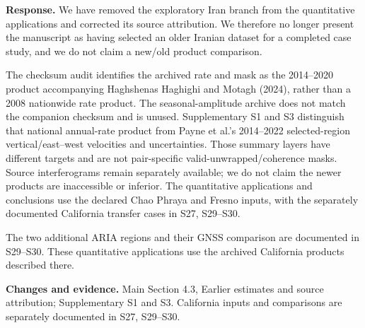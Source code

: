 \documentclass[11pt,a4paper]{article}
\begin{document}
\textbf{Response.} We have removed the exploratory Iran branch from the quantitative applications and corrected its source attribution. We therefore no longer present the manuscript as having selected an older Iranian dataset for a completed case study, and we do not claim a new/old product comparison.

The checksum audit identifies the archived rate and mask as the 2014--2020 product accompanying Haghshenas Haghighi and Motagh (2024), rather than a 2008 nationwide rate product. The seasonal-amplitude archive does not match the companion checksum and is unused. Supplementary S1 and S3 distinguish that national annual-rate product from Payne et al.'s 2014--2022 selected-region vertical/east--west velocities and uncertainties. Those summary layers have different targets and are not pair-specific valid-unwrapped/coherence masks. Source interferograms remain separately available; we do not claim the newer products are inaccessible or inferior. The quantitative applications and conclusions use the declared Chao Phraya and Fresno inputs, with the separately documented California transfer cases in S27, S29--S30.

The two additional ARIA regions and their GNSS comparison are documented in S29--S30. These quantitative applications use the archived California products described there.

\textbf{Changes and evidence.} Main Section 4.3, Earlier estimates and source attribution; Supplementary S1 and S3. California inputs and comparisons are separately documented in S27, S29--S30.


\end{document}
